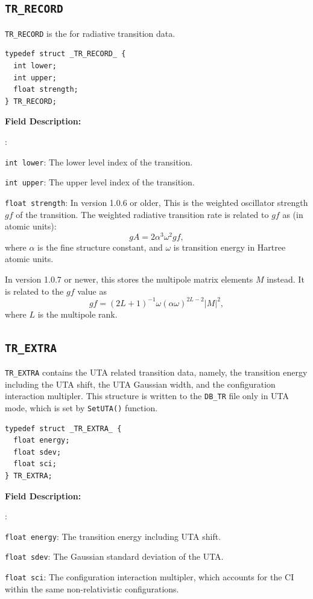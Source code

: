 \documentclass[twoside,letterpaper]{refrep}
\newcommand{\key}[1]{\texttt{#1}}
\newenvironment{dbdesc}{\textbf{Field Description:} \begin{list}
	{:}{\setlength{\labelwidth}{2in}
	   \setlength{\leftmargin}{2in}
	   \setlength{\labelsep}{0.1in}
	   \setlength{\rightmargin}{0.2in}}}
	{\end{list}}
\begin{document}
\subsection{\texttt{TR\_RECORD}}
\texttt{TR\_RECORD} is the for radiative transition data.

\begin{verbatim}
typedef struct _TR_RECORD_ {
  int lower;
  int upper;
  float strength;
} TR_RECORD;
\end{verbatim}

\begin{dbdesc}
\item[\texttt{int lower}:] The lower level index of the transition.
\item[\texttt{int upper}:] The upper level index of the transition.
\item[\texttt{float strength}:] In version 1.0.6 or older, This is the
  weighted oscillator strength $gf$ of the transition. The weighted radiative
  transition rate is related to $gf$ as (in atomic units):
\begin{equation}
gA = 2\alpha^3 \omega^2 gf,
\end{equation}
where $\alpha$ is the fine structure constant, and $\omega$ is transition
energy in Hartree atomic units. 

In version 1.0.7 or newer, this stores the multipole matrix elements $M$
instead. It is related to the $gf$ value as
\begin{equation}
gf =
\left(2L+1\right)^{-1}\omega\left(\alpha\omega\right)^{2L-2}\left|M\right|^2,
\end{equation}
where $L$ is the multipole rank.
\end{dbdesc}

\subsection{\texttt{TR\_EXTRA}}
\texttt{TR\_EXTRA} contains the UTA related transition data, namely, the
transition energy including the UTA shift, the UTA Gaussian width, and the
configuration interaction multipler. This structure is written to the
\texttt{DB\_TR} file only in UTA mode, which is set by \key{SetUTA()}
function.

\begin{verbatim}
typedef struct _TR_EXTRA_ {
  float energy;
  float sdev;
  float sci;
} TR_EXTRA;
\end{verbatim}

\begin{dbdesc}
\item[\texttt{float energy}:] The transition energy including UTA shift.
\item[\texttt{float sdev}:] The Gaussian standard deviation of the UTA.
\item[\texttt{float sci}:] The configuration interaction multipler, which
  accounts for the CI within the same non-relativistic configurations.
\end{dbdesc}
\end{document}
